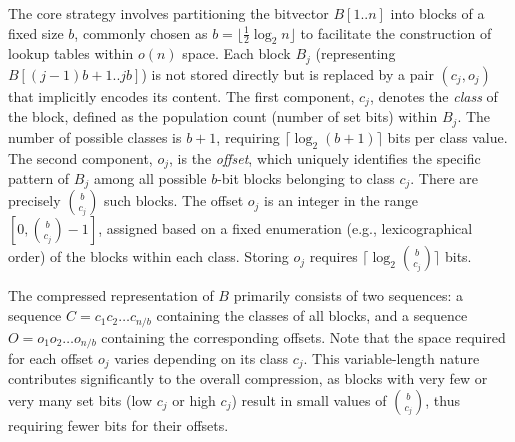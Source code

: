 The core strategy involves partitioning the bitvector $B[1..n]$ into blocks of a fixed size $b$, commonly chosen as $b = \lfloor \frac{1}{2}\log_2 n \rfloor$ to facilitate the construction of lookup tables within $o(n)$ space. Each block $B_j$ (representing $B[(j-1)b+1 .. jb]$) is not stored directly but is replaced by a pair $(c_j, o_j)$ that implicitly encodes its content.
The first component, $c_j$, denotes the \emph{class} of the block, defined as the population count (number of set bits) within $B_j$. The number of possible classes is $b+1$, requiring $\lceil \log_2(b+1) \rceil$ bits per class value.
The second component, $o_j$, is the \emph{offset}, which uniquely identifies the specific pattern of $B_j$ among all possible $b$-bit blocks belonging to class $c_j$. There are precisely $\binom{b}{c_j}$ such blocks. The offset $o_j$ is an integer in the range $[0, \binom{b}{c_j}-1]$, assigned based on a fixed enumeration (e.g., lexicographical order) of the blocks within each class. Storing $o_j$ requires $\lceil \log_2 \binom{b}{c_j} \rceil$ bits.

The compressed representation of $B$ primarily consists of two sequences: a sequence $C = c_1 c_2 \dots c_{n/b}$ containing the classes of all blocks, and a sequence $O = o_1 o_2 \dots o_{n/b}$ containing the corresponding offsets. Note that the space required for each offset $o_j$ varies depending on its class $c_j$. This variable-length nature contributes significantly to the overall compression, as blocks with very few or very many set bits (low $c_j$ or high $c_j$) result in small values of $\binom{b}{c_j}$, thus requiring fewer bits for their offsets.

